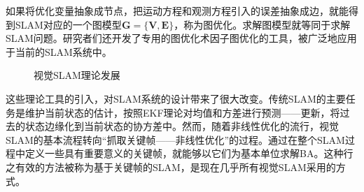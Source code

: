 如果将优化变量抽象成节点，把运动方程和观测方程引入的误差抽象成边，就能得到SLAM对应的一个图模型$\boldsymbol{G}=\lbrace \boldsymbol{V}, \boldsymbol{E} \rbrace$，称为图优化\upcite{}。求解图模型就等同于求解SLAM问题。研究者们还开发了专用的图优化术因子图优化的工具\upcite{}，被广泛地应用于当前的SLAM系统中。

\begin{figure}
    \centering
     \caption{视觉SLAM理论发展}
\label{fig1.1}
\end{figure}


这些理论工具的引入，对SLAM系统的设计带来了很大改变。传统SLAM的主要任务是维护当前状态的估计，按照EKF理论对均值和方差进行预测——更新，将过去的状态边缘化到当前状态的协方差中。然而，随着非线性优化的流行，视觉SLAM的基本流程转向“抓取关键帧——非线性优化”的过程。通过在整个SLAM过程中定义一些具有重要意义的关键帧，就能够以它们为基本单位求解BA。这种行之有效的方法被称为基于关键帧的SLAM，是现在几乎所有视觉SLAM采用的方式\upcite{}。



